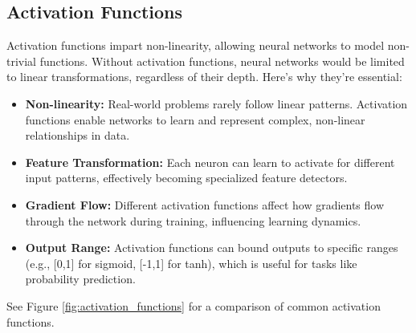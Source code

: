\subsection{Activation Functions}
\noindent
Activation functions impart non-linearity, allowing neural networks to model non-trivial functions. Without activation functions, neural networks would be limited to linear transformations, regardless of their depth. Here's why they're essential:

\begin{itemize}
    \item \textbf{Non-linearity:} Real-world problems rarely follow linear patterns. Activation functions enable networks to learn and represent complex, non-linear relationships in data.
    
    \item \textbf{Feature Transformation:} Each neuron can learn to activate for different input patterns, effectively becoming specialized feature detectors.
    
    \item \textbf{Gradient Flow:} Different activation functions affect how gradients flow through the network during training, influencing learning dynamics.
    
    \item \textbf{Output Range:} Activation functions can bound outputs to specific ranges (e.g., [0,1] for sigmoid, [-1,1] for tanh), which is useful for tasks like probability prediction.
\end{itemize}

See Figure \ref{fig:activation_functions} for a comparison of common activation functions.

